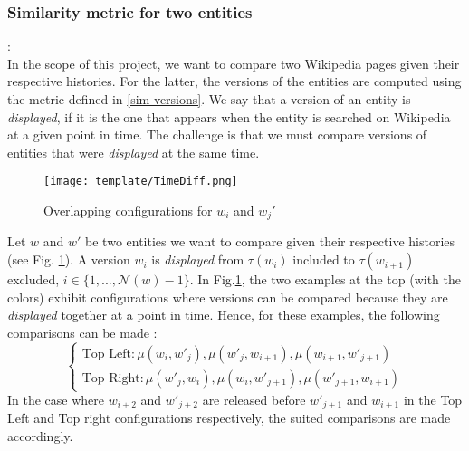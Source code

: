 \documentclass[sigconf]{acmart}
\begin{document}
\subsubsection{Similarity metric for two entities}:\\
\label{sim entities}
In the scope of this project, we want to compare two Wikipedia pages given their respective histories. For the latter, the versions of the entities are computed using the metric defined in \ref{sim versions}. We say that a version of an entity is \emph{displayed}, if it is the one that appears when the entity is searched on Wikipedia at a given point in time.
The challenge is that we must compare versions of entities that were \emph{displayed} at the same time. 
\begin{figure}[H]
    \centering
    \texttt{[image: template/TimeDiff.png]}
    \vspace*{-4mm}
    \caption{Overlapping configurations for $w_i$ and $w_j'$}
    \label{Overlap}
\end{figure}
Let $w$ and $w'$ be two entities we want to compare given their respective histories (see Fig. \ref{Overlap}). A version $w_i$ is \emph{displayed} from $\tau(w_i)$ included to $\tau(w_{i+1})$ excluded, $i \in \{1,...,\mathcal{N}(w)-1\}$.
In Fig.\ref{Overlap}, the two examples at the top (with the colors) exhibit configurations where versions can be compared because they are \emph{displayed} together at a point in time. Hence, for these examples, the following comparisons can be made :
\begin{equation}
    \begin{cases}
    \text{Top Left}: \mu(w_i,w'_j), \mu(w'_j,w_{i+1}), \mu(w_{i+1},w'_{j+1}) \\
    \text{Top Right}: \mu(w'_j,w_i), \mu(w_i,w'_{j+1}), \mu(w'_{j+1},w_{i+1})
    \end{cases}
\end{equation}
In the case where $w_{i+2}$ and $w'_{j+2}$ are released before $w'_{j+1}$ and $w_{i+1}$ in the Top Left and Top right configurations respectively, the suited comparisons are made accordingly.
\end{document}
